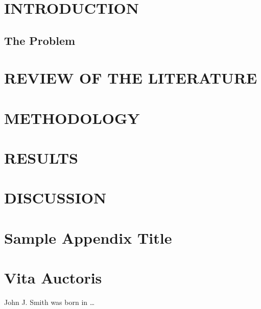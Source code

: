 \documentclass[12pt,oneside]{book}
\begin{document}
\chapter{INTRODUCTION}
\section{The Problem}

\chapter{REVIEW OF THE LITERATURE}

\chapter{METHODOLOGY}

\chapter{RESULTS}

\chapter{DISCUSSION}

\appendix
\chapter{Sample Appendix Title}

\backmatter


\chapter*{Vita Auctoris}
John J. Smith was born in …  %
\end{document}
